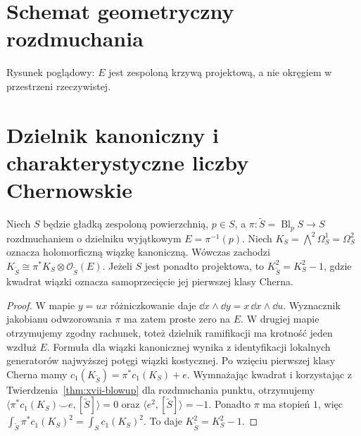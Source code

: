 \section{Schemat geometryczny rozdmuchania}
\begin{center}
\par\smallskip\small Rysunek poglądowy: $E$ jest zespoloną krzywą projektową,
a nie okręgiem w przestrzeni rzeczywistej.
\end{center}

\section{Dzielnik kanoniczny i charakterystyczne liczby Chernowskie}
\begin{twierdzenie}
\label{thm:xvii-canonical}
Niech $S$ będzie gładką zespoloną powierzchnią,
$p\in S$, a $\pi:\widetilde S=\operatorname{Bl}_pS\to S$
rozdmuchaniem o dzielniku wyjątkowym $E=\pi^{-1}(p)$.
Niech $K_S=\bigwedge^2\Omega_S^1=\Omega_S^2$
oznacza holomorficzną wiązkę kanoniczną.
Wówczas zachodzi
$K_{\widetilde S}\cong\pi^*K_S\otimes\mathcal O_{\widetilde S}(E)$.
Jeżeli $S$ jest ponadto projektowa, to
$K_{\widetilde S}^2=K_S^2-1$,
gdzie kwadrat wiązki oznacza samoprzecięcie jej
pierwszej klasy Cherna.
\end{twierdzenie}
\begin{proof}
W mapie $y=ux$ różniczkowanie daje
$\dd x\wedge\dd y=x\,\dd x\wedge\dd u$.
Wyznacznik jakobianu odwzorowania $\pi$
ma zatem proste zero na $E$.
W drugiej mapie otrzymujemy zgodny rachunek, toteż
dzielnik ramifikacji ma krotność jeden wzdłuż $E$.
Formuła dla wiązki kanonicznej wynika z identyfikacji
lokalnych generatorów najwyższej potęgi wiązki kostycznej.
Po wzięciu pierwszej klasy Cherna mamy
$c_1(K_{\widetilde S})=\pi^*c_1(K_S)+e$.
Wymnażając kwadrat i korzystając z
Twierdzenia~\ref{thm:xvii-blowup} dla rozdmuchania punktu,
otrzymujemy
$\langle\pi^*c_1(K_S)\smile e,[\widetilde S]\rangle=0$
oraz $\langle e^2,[\widetilde S]\rangle=-1$.
Ponadto $\pi$ ma stopień $1$, więc
$\int_{\widetilde S}\pi^*c_1(K_S)^2
=\int_Sc_1(K_S)^2$.
To daje $K_{\widetilde S}^2=K_S^2-1$.
\end{proof}

